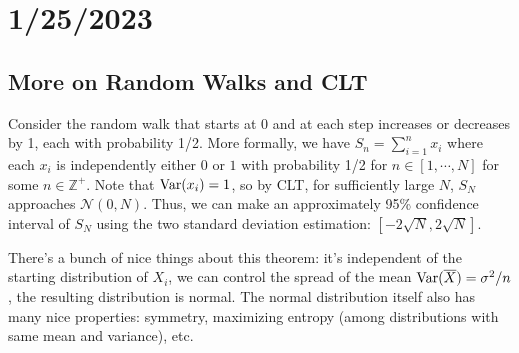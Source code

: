\chapter{1/25/2023}
\section{More on Random Walks and CLT}
Consider the random walk that starts at 0 and at each step increases or decreases by 1, each with probability 1/2. More formally, we have $S_n=\sum_{i=1}^n x_i$ where each $x_i$ is independently either $0$ or $1$ with probability 1/2 for $n\in[1,\cdots,N]$ for some $n\in\mathbb Z^+$. Note that $\operatorname{Var}(x_i)=1$, so by CLT, for sufficiently large $N$, $S_N$ approaches $\mathcal N(0,N)$. Thus, we can make an approximately 95\% confidence interval of $S_N$ using the two standard deviation estimation: $[-2\sqrt N, 2\sqrt N]$.

There's a bunch of nice things about this theorem: it's independent of the starting distribution of $X_i$, we can control the spread of the mean $\operatorname{Var}(\overline X)=\sigma^2/n$, the resulting distribution is normal. The normal distribution itself also has many nice properties: symmetry, maximizing entropy (among distributions with same mean and variance), etc.

